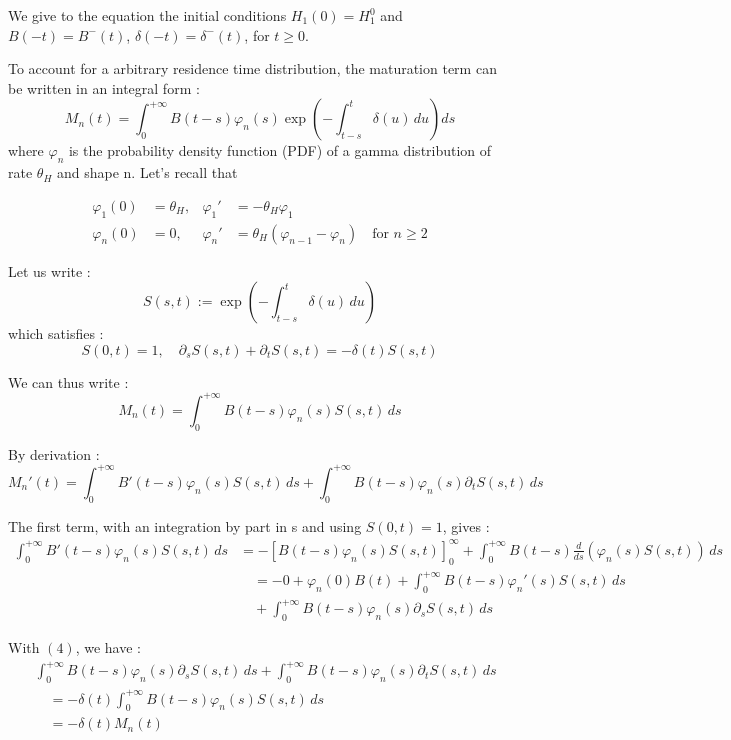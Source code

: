 \documentclass[12pt,a4paper,onecolumn]{article}
\begin{document}
We give to the equation the initial conditions $H_1(0) = H_1^0$ and $B(-t) = B^{-}(t)$, $\delta(-t) = \delta^{-}(t)$, for $t \geq 0$.

To account for a arbitrary residence time distribution, the maturation term can be written in an integral form :
\begin{equation}
M_n(t) = \int_0^{+\infty} B(t-s)\varphi_n(s) \exp\left( -\int_{t-s}^{t} \delta(u) \, du \right) ds
\end{equation}
where $\varphi_n$ is the probability density function (PDF) of a gamma distribution of rate $\theta_H$ and shape n. Let's recall that

\begin{align}
\varphi_1(0) &= \theta_H, & \varphi_1' &= -\theta_H \varphi_1 \\
\varphi_n(0) &= 0, & \varphi_n' &= \theta_H (\varphi_{n-1} - \varphi_n) \quad \text{for } n \geq 2
\end{align}

Let us write :
\[
S(s, t) := \exp\left( -\int_{t-s}^{t} \delta(u) \, du \right)
\]
which satisfies :
\begin{equation}
S(0, t) = 1, \quad \partial_s S(s,t) + \partial_t S(s,t) = -\delta(t) S(s,t)
\end{equation}

We can thus write :
\begin{equation}
M_n(t) = \int_0^{+\infty} B(t-s)\varphi_n(s)S(s,t) \, ds
\end{equation}

By derivation :
\[
M_n'(t) = \int_0^{+\infty} B'(t-s)\varphi_n(s)S(s,t) \, ds + \int_0^{+\infty} B(t-s)\varphi_n(s) \partial_t S(s,t) \, ds
\]

The first term, with an integration by part in s and using $S(0,t) = 1$, gives :
\begin{align*}
\int_0^{+\infty} B'(t-s)\varphi_n(s)S(s,t) \, ds &= -[B(t-s) \varphi_n(s) S(s,t) ]_{0}^{\infty} + \int_0^{+\infty} B(t-s)\frac{d}{ds}(\varphi_n(s)S(s,t)) \, ds \\
&\quad = -0 + \varphi_n(0) B(t) + \int_0^{+\infty} B(t-s)\varphi_n'(s) S(s,t) \, ds \\
&\quad + \int_0^{+\infty} B(t-s)\varphi_n(s) \partial_s S(s,t) \, ds
\end{align*}

With $(4)$, we have :
\begin{align*}
&\int_0^{+\infty} B(t-s)\varphi_n(s) \partial_s S(s,t) \, ds  + \int_0^{+\infty} B(t-s)\varphi_n(s) \partial_t S(s,t) \, ds \\
&\quad = - \delta(t) \int_0^{+\infty} B(t-s)\varphi_n(s) S(s,t)  \, ds \\
&\quad = - \delta(t) M_n(t)
\end{align*}
\end{document}
